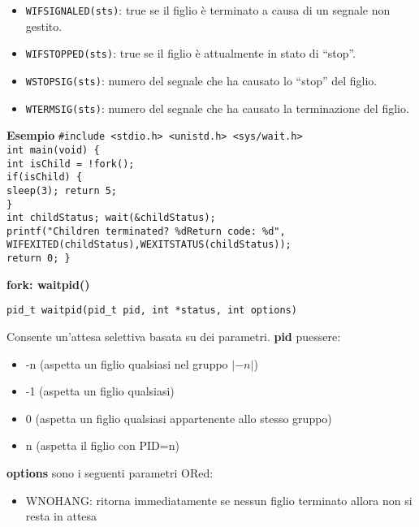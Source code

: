 \begin{flushleft}
\begin{flushleft}
\begin{flushleft}
\begin{itemize}
        \item \texttt{WIFSIGNALED(sts)}: true se il figlio è terminato a causa di un segnale non gestito.
        \item \texttt{WIFSTOPPED(sts)}: true se il figlio è attualmente in stato di “stop”.
        \item \texttt{WSTOPSIG(sts)}: numero del segnale che ha causato lo “stop” del figlio.
        \item \texttt{WTERMSIG(sts)}: numero del segnale che ha causato la terminazione del figlio.
      \end{itemize}
      \textbf{Esempio}
      \texttt{\#include <stdio.h> <unistd.h> <sys/wait.h> \\
              int main(void) \{ \\
              \halftab int isChild = !fork(); \\
              \halftab if(isChild) \{ \\
              \tab sleep(3); return 5; \\
              \halftab \} \\
              \halftab int childStatus; \halftab wait(\&childStatus); \\
              \halftab printf("Children terminated? \%d\n Return code: \%d\n",
              \tab WIFEXITED(childStatus),WEXITSTATUS(childStatus)); \\
              \halftab return 0;
              \}}\\
      \begin{flushleft}
      \textbf{fork: waitpid()} \par 
        \texttt{pid\_t waitpid(pid\_t pid, int *status, int options)}
      \end{flushleft}
      Consente un'attesa selettiva basata su dei parametri. \textbf{pid} pu\ace essere:
      \begin{itemize}
        \item -n (aspetta un figlio qualsiasi nel gruppo $|-n|$)
        \item -1 (aspetta un figlio qualsiasi)
        \item 0 (aspetta un figlio qualsiasi appartenente allo stesso gruppo)
        \item n (aspetta il figlio con PID=n)
      \end{itemize}
      \textbf{options} sono i seguenti parametri ORed:
      \begin{itemize}
        \item WNOHANG: ritorna immediatamente se nessun figlio \ace terminato allora non si resta in attesa

\end{itemize}
\end{flushleft}
\end{flushleft}
\end{flushleft}

